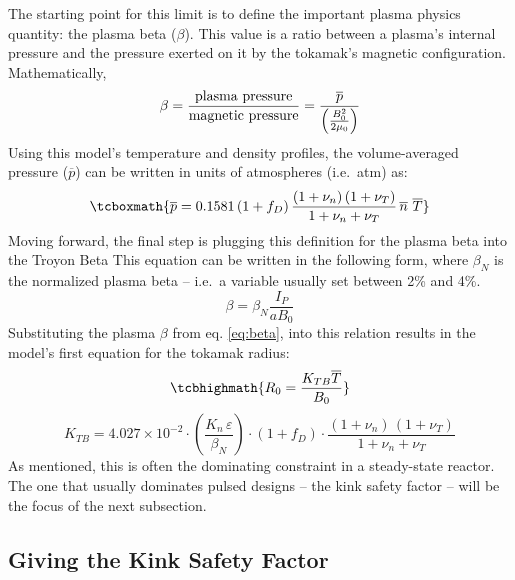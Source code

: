 The starting point for this limit is to define the important plasma physics quantity: the plasma beta ($\beta$). This value is a ratio between a plasma's internal pressure and the pressure exerted on it by the tokamak's magnetic configuration. Mathematically, \cite{jeff}
\begin{equation}
	\label{eq:beta}
	\beta = \frac{\textnormal{plasma pressure}}{\textnormal{magnetic pressure}} = \frac{ \overline p }{ \left( \frac{B_0^2}{2 \mu_0} \right) }
\end{equation}
Using this model's temperature and density profiles, the volume-averaged pressure ($\overline p$) can be written in units of atmospheres (i.e.\ atm) as:
\begin{equation}
\tcboxmath{
  \overline{p} = 0.1581 \, ( 1 + f_D ) \, \frac{ (1 + \nu_n) \, (1 + \nu_T) }{1 + \nu_n + \nu_T } \, \overline{n} \ \overline{T}
  }
\end{equation}
Moving forward, the final step is plugging this definition for the plasma beta into the Troyon Beta  This equation can be written in the following form, where $\beta_N$ is the normalized plasma beta -- i.e.\ a  variable usually set between 2\% and 4\%. \cite{hartmann}
\begin{equation}
	\beta = \beta_N \frac{ I_P }{ a B_0 }
\end{equation}
Substituting the plasma $\beta$ from eq. \ref{eq:beta}, into this relation results in the model's first equation for the tokamak radius:
\begin{equation}
  \label{eq:r_beta}
  \tcbhighmath{ R_0 = \frac{ K_{TB} \overline{T} }{ B_0 } }
\end{equation}
\begin{equation}
  K_{TB} = 4.027 \times 10^{-2} \cdot  \left( \frac{K_n \, \varepsilon}{\beta_N} \right) \cdot ( 1 + f_D ) \cdot \frac{ (1 + \nu_n) \, (1 + \nu_T) }{1 + \nu_n + \nu_T }
\end{equation}
As mentioned, this is often the dominating constraint in a steady-state reactor. The one that usually dominates pulsed designs -- the kink safety factor -- will be the focus of the next subsection.

\subsection{Giving the Kink Safety Factor}

